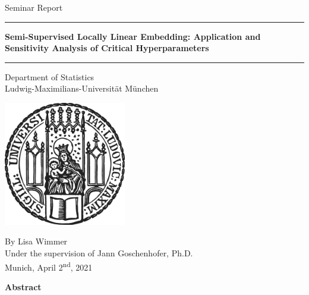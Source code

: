 \documentclass[12pt]{article}
\begin{document}


 
\begin{titlepage}
\begin{center}
    
\LARGE
Seminar Report
    
\vspace{0.5cm}
      
\rule{\textwidth}{1.5pt}
\LARGE 
\textbf{Semi-Supervised Locally Linear Embedding: Application and Sensitivity 
Analysis of Critical Hyperparameters}
\rule{\textwidth}{1.5pt}
   
\vspace{0.5cm}
      
\large
Department of Statistics \\
Ludwig-Maximilians-Universität München
      
\vspace{3.5cm}

\includegraphics[width = 0.4\textwidth]{figures/sigillum.png}

\vspace{3.5cm}

\large
By Lisa Wimmer \\
Under the supervision of Jann Goschenhofer, Ph.D. \\
Munich, April 2\textsuperscript{nd}, 2021

\end{center}
\end{titlepage}


\newpage

\Large
\noindent
\textbf{Abstract}
\vspace{0.5cm} \\
\noindent
\normalsize

\newpage
\end{document}
